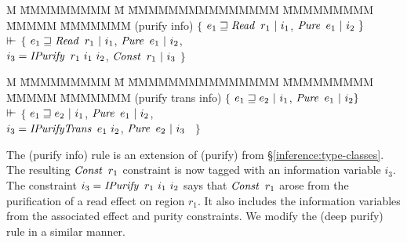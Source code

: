 \begin{tabbing}
	M \= MMMMMMMMM \= M \= MMMMMMMMMMMMMMM	\= MMMMMMMMM \= MMMMM \= MMMMMMM \kill
	\> (purify info)	
		\> $\{$ \> $e_1 \sqsupseteq \operatorname{\mathit{Read}} \ r_1 \ | \ i_1$, 
		\> $\operatorname{\mathit{Pure}} \ e_1 \ | \ i_2 \ \}$ 
	\\[1em]
	\> \qq $\vdash\mkern-6mu\vdash$	
		\> $\{$	\> $e_1 \sqsupseteq \operatorname{\mathit{Read}} \ r_1 \ | \ i_1$, \> $\operatorname{\mathit{Pure}} \ e_1 \ | \ i_2$, \\
	\>	\>	\> $i_3 = \iIPurify \ r_1 \ i_1 \ i_2$, \> $\operatorname{\mathit{Const}} \ r_1 \  | \ i_3$ $\}$

\end{tabbing}

\begin{tabbing}
	M \= MMMMMMMMM \= M \= MMMMMMMMMMMMMMM 	\= MMMMMMMMM \= MMMMM \= MMMMMMM\kill
	\> (purify trans info)	
		\> $\{$	\> $e_1 \sqsupseteq e_2 \ | \ i_1$, 	
		\> $\operatorname{\mathit{Pure}} \ e_1 \ | \ i_2 \}$ 
	\\[1em]
	\> \qq $\vdash\mkern-6mu\vdash$	
		\> $\{$	\> $e_1 \sqsupseteq e_2 \ | \ i_1$, 
			\> $\operatorname{\mathit{Pure}} \ e_1 \ | \ i_2$, \\
	\>	\>	\> $i_3 = \operatorname{\mathit{IPurifyTrans}} \ e_1 \ i_2$,
			\> $\operatorname{\mathit{Pure}} \ e_2 \ | \ i_3$ \ $\}$ 
\end{tabbing}

The (purify info) rule is an extension of (purify) from \S\ref{inference:type-classes}. The resulting $\operatorname{\mathit{Const}} \ r_1$ constraint is now tagged with an information variable $i_3$. The constraint $i_3 = \iIPurify \ r_1 \ i_1 \ i_2$ says that $\operatorname{\mathit{Const}} \ r_1$ arose from the purification of a read effect on region $r_1$. It also includes the information variables from the associated effect and purity constraints. We modify the (deep purify) rule in a similar manner.

